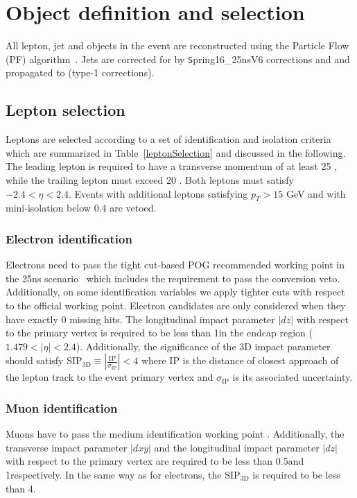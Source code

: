 \section{Object definition and selection}

  All lepton, jet and \met objects in the event are reconstructed using the Particle Flow (PF) algorithm~\citep{CMS-PAS-PFT-09-001}.
  Jets are corrected for by {\texttt Spring16\_25nsV6} corrections and and propagated to \ETmiss (type-1 corrections). 
  \subsection{Lepton selection}
    Leptons are selected according to a set of identification and isolation criteria which are summarized in Table~\ref{leptonSelection} and discussed in the following.
    The leading lepton is required to have a transverse momentum of at least 25 \GeV, while the trailing lepton must exceed 20 \GeV.
    Both leptons must satisfy $-2.4 < \eta < 2.4$. 
    Events with additional leptons satisfying $p_T> 15$ GeV and with mini-isolation below 0.4 are vetoed.

    

    \subsubsection{Electron identification}
      Electrons need to pass the tight cut-based POG recommended working point in the 25ns scenario~\citep{twiki:eleId} which includes the
      requirement to pass the conversion veto. Additionally, on some identification variables we apply tighter cuts with respect to the official working point. Electron candidates 
      are only considered when they have exactly 0 missing hits. The longitudinal impact parameter $|dz|$ with respect to the primary vertex
      is required to be less than 1\mm in the endcap region ($1.479 < |\eta| < 2.4$). %
      Additionally, the significance of the 3D impact parameter should satisfy $\text{SIP}_\text{3D} \equiv \left| \frac{\text{IP}}{\sigma_\text{IP}} \right| < 4$ 
      where IP is the distance of closest approach of the lepton track to the event primary vertex and $\sigma_\text{IP}$ is its associated uncertainty. 

    \subsubsection{Muon identification}
      Muons have to pass the medium identification working point \citep{twiki:muonID}. Additionally, the transverse impact parameter $|dxy|$ and the longitudinal impact parameter $|dz|$ with respect to the primary vertex
      are required to be less than 0.5\mm and 1\mm respectively. In the same way as for electrons, the $\text{SIP}_\text{3D}$ is required to be less than 4.

